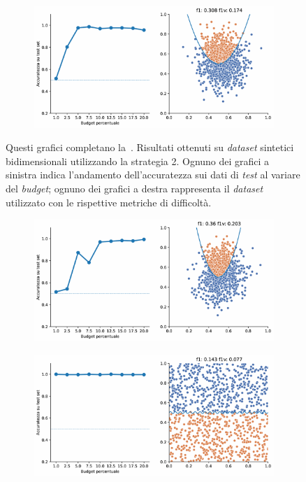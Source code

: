 \begin{appendices}
\begin{figure}[b!]
    \hfill
    \begin{subfigure}{.8\textwidth}
        \centering
        \includegraphics[width=\textwidth]{img/2d_v2/3.pdf}
    \end{subfigure}
    \caption[Risultati su \emph{dataset} sintetici utilizzando la strategia 2.]{Questi grafici completano la~. Risultati ottenuti su \emph{dataset} sintetici bidimensionali utilizzando la strategia 2. Ognuno dei grafici a sinistra indica l'andamento dell'accuratezza sui dati di \emph{test} al variare del \emph{budget}; ognuno dei grafici a destra rappresenta il \emph{dataset} utilizzato con le rispettive metriche di difficoltà.}
\end{figure}
\begin{figure}[ht]\ContinuedFloat
    \centering
    \begin{subfigure}{.8\textwidth}
        \centering
        \includegraphics[width=\textwidth]{img/2d_v2/5.pdf}
    \end{subfigure}%
    \hfill
    \begin{subfigure}{.8\textwidth}
        \centering
        \includegraphics[width=\textwidth]{img/2d_v2/6.pdf}

\end{subfigure}
\end{figure}
\end{appendices}
